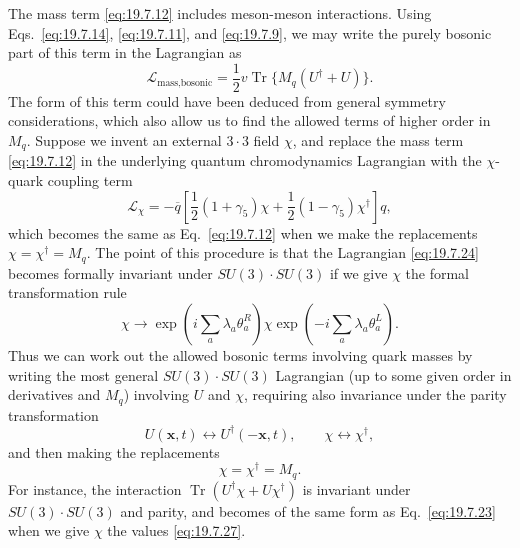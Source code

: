 The mass term \eqref{eq:19.7.12} includes meson-meson interactions. Using Eqs.~\eqref{eq:19.7.14}, \eqref{eq:19.7.11}, and \eqref{eq:19.7.9}, we may write the purely bosonic part of this term in the Lagrangian as
\begin{equation}
\mathcal L_{\text{mass,bosonic}}
=\frac12v\operatorname{Tr}\{M_q(U^\dagger+U)\}.
\tag{19.7.23}\label{eq:19.7.23}
\end{equation}
The form of this term could have been deduced from general symmetry considerations, which also allow us to find the allowed terms of higher order in $M_q$. Suppose we invent an external $3\cdot3$ field $\chi$, and replace the mass term \eqref{eq:19.7.12} in the underlying quantum chromodynamics Lagrangian with the $\chi$-quark coupling term
\begin{equation}
\mathcal L_\chi
=-\overline q\left[
\frac12(1+\gamma_5)\chi
+\frac12(1-\gamma_5)\chi^\dagger
\right]q,
\tag{19.7.24}\label{eq:19.7.24}
\end{equation}
which becomes the same as Eq.~\eqref{eq:19.7.12} when we make the replacements $\chi=\chi^\dagger=M_q$. The point of this procedure is that the Lagrangian \eqref{eq:19.7.24} becomes formally invariant under $SU(3)\cdot SU(3)$ if we give $\chi$ the formal transformation rule
\begin{equation}
\chi\longrightarrow
\exp\left(i\sum_a\lambda_a\theta_a^R\right)
\chi
\exp\left(-i\sum_a\lambda_a\theta_a^L\right).
\tag{19.7.25}\label{eq:19.7.25}
\end{equation}
Thus we can work out the allowed bosonic terms involving quark masses by writing the most general $SU(3)\cdot SU(3)$ Lagrangian (up to some given order in derivatives and $M_q$) involving $U$ and $\chi$, requiring also invariance under the parity transformation
\begin{equation}
U(\boldsymbol x,t)\longleftrightarrow U^\dagger(-\boldsymbol x,t),
\qquad
\chi\longleftrightarrow\chi^\dagger,
\tag{19.7.26}\label{eq:19.7.26}
\end{equation}
and then making the replacements
\begin{equation}
\chi=\chi^\dagger=M_q.
\tag{19.7.27}\label{eq:19.7.27}
\end{equation}
For instance, the interaction $\operatorname{Tr}(U^\dagger\chi+U\chi^\dagger)$ is invariant under $SU(3)\cdot SU(3)$ and parity, and becomes of the same form as Eq.~\eqref{eq:19.7.23} when we give $\chi$ the values \eqref{eq:19.7.27}.

